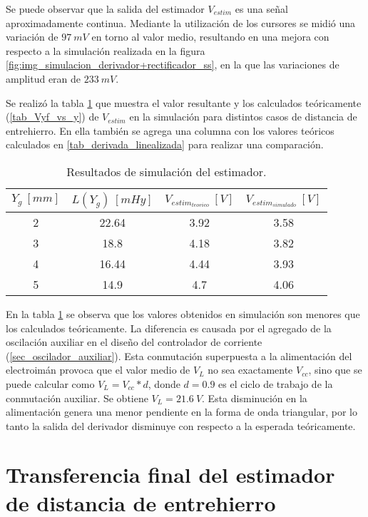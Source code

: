 Se puede observar que la salida del estimador $V_{estim}$ es una señal aproximadamente continua. Mediante la utilización de los cursores se midió una variación de $97\:mV$ en torno al valor medio, resultando en una mejora con respecto a la simulación realizada en la figura \ref{fig:img_simulacion_derivador+rectificador_ss}, en la que las variaciones de amplitud eran de $233\:mV$.

Se realizó la tabla \ref{tab_Resultados_de_simulación_del_estimador} que muestra el valor resultante y los calculados teóricamente (\ref{tab_Vyf_vs_y}) de $V_{estim}$ en la simulación para distintos casos de distancia de entrehierro. En ella también se agrega una columna con los valores teóricos calculados en \ref{tab_derivada_linealizada} para realizar una comparación.

\begin{table}[H]
	\begin{center}
		\begin{tabular}{| c | c | c | c |}
			\hline
			$Y_g\:[mm]$ & $L(Y_g)\:[mHy]$ & $V_{estim_{teorico}}\:[V]$ & $V_{estim_{simulado}}\:[V]$ \\ \hline 
			2 & 22.64 & 3.92 &3.58 \\ \hline 
			3 & 18.8 & 4.18 &3.82 \\ \hline 
			4 & 16.44 & 4.44 &3.93 \\ \hline 
			5 & 14.9 & 4.7 &4.06 \\ \hline 
		\end{tabular}
		\caption{Resultados de simulación del estimador.}
		\label{tab_Resultados_de_simulación_del_estimador}
	\end{center}
\end{table}

En la tabla \ref{tab_Resultados_de_simulación_del_estimador} se observa que los valores obtenidos en simulación son menores que los calculados teóricamente. La diferencia es causada por el agregado de la oscilación auxiliar en el diseño del controlador de corriente (\ref{sec_oscilador_auxiliar}). Esta conmutación superpuesta a la alimentación del electroimán provoca que el valor medio de $V_L$ no sea exactamente $V_{cc}$, sino que se puede calcular como $V_L=V_{cc}*d$, donde $d=0.9$ es el ciclo de trabajo de la conmutación auxiliar. Se obtiene $V_L=21.6\:V$. Esta disminución en la alimentación genera una menor pendiente en la forma de onda triangular, por lo tanto la salida del derivador disminuye con respecto a la esperada teóricamente. 

\section{Transferencia final del estimador de distancia de entrehierro}


